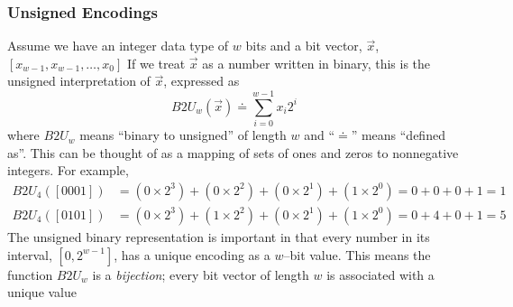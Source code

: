 \documentclass[../bryant_comp_sys.tex]{subfiles}
\begin{document}
            \subsubsection{Unsigned Encodings}
                \begin{outline}
                    \1 Assume we have an integer data type of \( w \) bits and a bit vector, \( \overrightarrow{x} \), \( \left[ x_{w-1}, x_{w-1}, \ldots, x_0 \right] \)
                        \2 If we treat \( \overrightarrow{x} \) as a number written in binary, this is the \gls{unsigned} interpretation of \( \overrightarrow{x} \), expressed as 
                        \[
                            B2U_{w}(\overrightarrow{x}) \doteq \sum_{i=0}^{w-1} x_i 2^i
                        \]
                        where \( B2U_w \) means ``binary to unsigned'' of length \( w \) and ``\( \doteq \)'' means ``defined as''.
                        \2 This can be thought of as a mapping of sets of ones and zeros to nonnegative integers.
                            \3 For example,
                            \begin{align*}
                                B2U_4(\left[ 0001 \right]) &= \left( 0 \times 2^3 \right) + \left( 0 \times 2^2 \right) + \left( 0 \times 2^1 \right) + \left( 1 \times 2^0 \right) = 0 + 0 + 0 + 1 = 1 \\
                                B2U_4(\left[ 0101 \right]) &= \left( 0 \times 2^3 \right) + \left( 1 \times 2^2 \right) + \left( 0 \times 2^1 \right) + \left( 1 \times 2^0 \right) = 0 + 4 + 0 + 1 = 5
                            \end{align*}
                    \1 The unsigned binary representation is important in that every number in its interval, \( \left[ 0, 2^{w-1} \right] \), has a unique encoding as a \( w \)--bit value.
                        \2 This means the function \( B2U_w \) is a \textit{bijection}; every bit vector of length \( w \) is associated with a unique value
                \end{outline}
\end{document}
